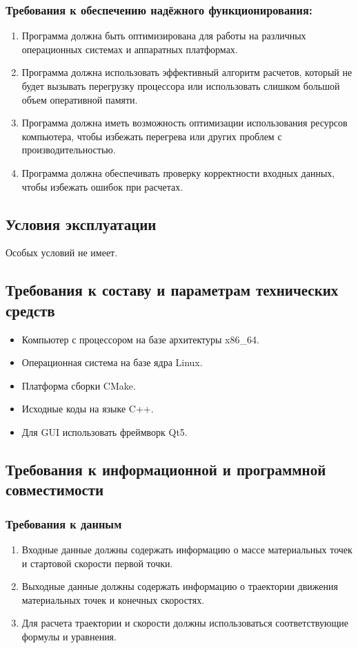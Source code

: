  \subsubsection{Требования к обеспечению надёжного функционирования:}
 \begin{enumerate}
  \item Программа должна быть оптимизирована для работы на различных операционных системах и аппаратных платформах.
  \item Программа должна использовать эффективный алгоритм расчетов, который не будет вызывать перегрузку процессора или использовать слишком большой объем оперативной памяти.
  \item Программа должна иметь возможность оптимизации использования ресурсов компьютера, чтобы избежать перегрева или других проблем с производительностью.
  \item Программа должна обеспечивать проверку корректности входных данных, чтобы избежать ошибок при расчетах.
 \end{enumerate}

 \subsection{Условия эксплуатации} Особых условий не имеет.
 \subsection{Требования к составу и параметрам технических средств}
 \begin{itemize}
  \item  Компьютер с процессором на базе архитектуры x86\_64.
  \item  Операционная система на базе ядра Linux.
  \item  Платформа сборки CMake.
  \item  Исходные коды на языке C++.
  \item  Для GUI использовать фреймворк Qt5.
 \end{itemize}


 \subsection{Требования к информационной и программной совместимости}
 \subsubsection{Требования к данным}
 \begin{enumerate}
  \item Входные данные должны содержать информацию о массе материальных точек и стартовой скорости первой точки.
  \item Выходные данные должны содержать информацию о траектории движения материальных точек и конечных скоростях.
  \item Для расчета траектории и скорости должны использоваться соответствующие формулы и уравнения.
 \end{enumerate}


